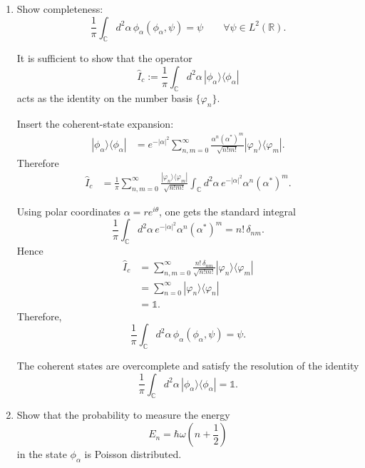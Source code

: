\documentclass[11pt,a4paper]{scrartcl}
\newcommand{\R}{\mathbb{R}}
\begin{document}
\begin{enumerate}[label=(\alph*)]
    \item Show completeness:
    \[
    \frac1\pi\int_{\mathbb{C}} d^2\alpha\, \phi_\alpha(\phi_\alpha,\psi)=\psi
    \qquad \forall \psi\in L^2(\R).
    \]

    \begin{calculationbox}
    It is sufficient to show that the operator
    \[
    \hat I_c := \frac1\pi\int_{\mathbb{C}} d^2\alpha\, |\phi_\alpha\rangle\langle \phi_\alpha|
    \]
    acts as the identity on the number basis $\{\varphi_n\}$.

    Insert the coherent-state expansion:
    \begin{align*}
        |\phi_\alpha\rangle\langle \phi_\alpha|
        &= e^{-|\alpha|^2}
        \sum_{n,m=0}^{\infty}
        \frac{\alpha^n(\alpha^*)^m}{\sqrt{n!m!}}
        |\varphi_n\rangle\langle\varphi_m|.
    \end{align*}
    Therefore
    \begin{align*}
        \hat I_c
        &= \frac1\pi \sum_{n,m=0}^{\infty}
        \frac{|\varphi_n\rangle\langle\varphi_m|}{\sqrt{n!m!}}
        \int_{\mathbb{C}} d^2\alpha\,
        e^{-|\alpha|^2}\alpha^n(\alpha^*)^m.
    \end{align*}

    Using polar coordinates $\alpha=re^{i\theta}$, one gets the standard integral
    \[
    \frac1\pi\int_{\mathbb{C}} d^2\alpha\,
    e^{-|\alpha|^2}\alpha^n(\alpha^*)^m
    = n!\,\delta_{nm}.
    \]
    Hence
    \begin{align*}
        \hat I_c
        &= \sum_{n,m=0}^{\infty}
        \frac{n!\,\delta_{nm}}{\sqrt{n!m!}}
        |\varphi_n\rangle\langle\varphi_m| \\
        &= \sum_{n=0}^{\infty} |\varphi_n\rangle\langle\varphi_n| \\
        &= \mathbb{1}.
    \end{align*}
    Therefore,
    \[
    \frac1\pi\int_{\mathbb{C}} d^2\alpha\, \phi_\alpha(\phi_\alpha,\psi)=\psi.
    \]
    \end{calculationbox}

    \begin{answerbox}
    The coherent states are overcomplete and satisfy the resolution of the identity
    \[
    \boxed{
    \frac1\pi\int_{\mathbb{C}} d^2\alpha\, |\phi_\alpha\rangle\langle \phi_\alpha| = \mathbb{1}.
    }
    \]
    \end{answerbox}

    \item Show that the probability to measure the energy
    \[
    E_n=\hbar\omega\left(n+\frac12\right)
    \]
    in the state $\phi_\alpha$ is Poisson distributed.


\end{enumerate}
\end{document}
